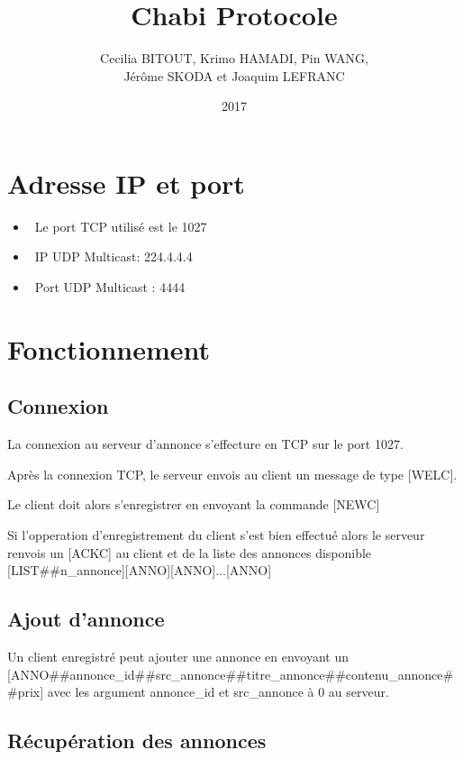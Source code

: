 \documentclass[12pt]{article}
\title{Chabi Protocole}
\author{
  Cecilia BITOUT, Krimo HAMADI, Pin WANG, \\
  Jérôme SKODA et Joaquim LEFRANC
}
\date{2017}
\begin{document}
\maketitle

\newcommand{\separator}{\#\#}

\section{Adresse IP et port}

\begin{itemize}
  \item~Le port TCP utilisé est le 1027
  \item~IP UDP Multicast: 224.4.4.4
  \item~Port UDP Multicast : 4444
\end{itemize}


\section{Fonctionnement}

\subsection{Connexion}

La connexion au serveur d'annonce s'effecture en TCP sur le port 1027.

Après la connexion TCP, le serveur envois au client un message de type [WELC].

Le client doit alors s'enregistrer en envoyant la commande [NEWC]

Si l'opperation d'enregistrement du client s'est bien effectué alors le serveur renvois un [ACKC] au client et de la liste des annonces disponible [LIST\separator{}n\_annonce][ANNO][ANNO]...[ANNO]


\subsection{Ajout d'annonce}

Un client enregistré peut ajouter une annonce en envoyant un [ANNO\separator{}annonce\_id\separator{}src\_annonce\separator{}titre\_annonce\separator{}contenu\_annonce\separator{}prix] avec les argument annonce\_id et src\_annonce à 0 au serveur.


\subsection{Récupération des annonces}
\end{document}

